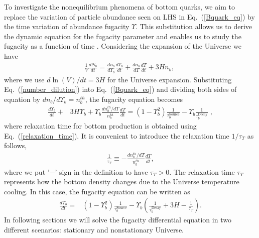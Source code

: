 To investigate the nonequilibrium phenomena of bottom quarks, we aim to replace the variation of particle abundance seen on LHS in Eq.~(\ref{Bquark_eq}) by the time variation of abundance fugacity $\Upsilon$.
This substitution allows us to derive the dynamic equation for the fugacity parameter and enables us to study the fugacity as a function of time . Considering the expansion of the Universe we have
\begin{align}\label{number_dilution}
\frac{1}{V}\frac{dN_b}{dt}=\frac{dn_b}{d\Upsilon_b}\frac{d\Upsilon_b}{dt}+\frac{dn_b}{dT}\frac{dT}{dt}+3Hn_b,\;
\end{align}
where we use $d\ln(V)/dt=3H$ for the Universe expansion. Substituting Eq.~(\ref{number_dilution}) into Eq.~(\ref{Bquark_eq}) and dividing both sides of equation by $dn_b/{d\Upsilon_b}=n^{th}_b$, the fugacity equation becomes
\begin{align}
\frac{d\Upsilon_b}{dt}+&3H\Upsilon_b+\Upsilon_b\frac{dn^{th}_b/dT}{n^{th}_b}\frac{dT}{dt}=\left(1-\Upsilon_b^2\right)\frac{1}{\tau_{b}^{\mathrm{Source}}}-\Upsilon_b\frac{1}{\tau^{\mathrm{Decay}}_b}\;,
\end{align}
where relaxation time for bottom production is obtained using Eq.~(\ref{relaxation_time}). It is convenient to introduce the relaxation time $1/\tau_T$ as follows,
\begin{align}
\frac{1}{\tau_T}\equiv-\frac{dn^{th}_b/dT}{n^{th}_b}\frac{dT}{dt},
\end{align}
where we put '$-$' sign in the definition to have $\tau_T>0$. The relaxation time $\tau_T$ represents how the bottom density changes due to the Universe temperature cooling. In this case, the fugacity equation can be written as
\begin{align}\label{Fugacity_Eq0}
\frac{d\Upsilon_b}{dt}\!\!=&(1-\Upsilon_{b}^2)\frac{1}{\tau_{b}^{\mathrm{Source}}}
\!-\!\Upsilon_{b}\left(\frac{1}{\tau^{\mathrm{Decay}}_b}+3H\!-\!\frac{1}{\tau_T}\right).
\end{align}
In following sections we will solve the fugacity differential equation in two different scenarios: stationary and nonstationary Universe.

